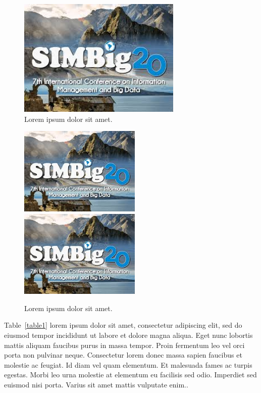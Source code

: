 \documentclass[runningheads]{llncs}
\begin{document}
\begin{figure}[!htbp]
\centerline{\includegraphics[width=78mm]{images/image-example.jpeg}}
\caption{Lorem ipsum dolor sit amet.} \label{figure3}
\end{figure}

\begin{figure}[!htbp]
\centering
{\includegraphics[width=58mm]{images/image-example.jpeg}} \quad
{\includegraphics[width=58mm]{images/image-example.jpeg}}
\caption{Lorem ipsum dolor sit amet.} \label{figure4}
\end{figure}


Table~\ref{table1} lorem ipsum dolor sit amet, consectetur adipiscing elit, sed do eiusmod tempor incididunt ut labore et dolore magna aliqua. Eget nunc lobortis mattis aliquam faucibus purus in massa tempor. Proin fermentum leo vel orci porta non pulvinar neque. Consectetur lorem donec massa sapien faucibus et molestie ac feugiat. Id diam vel quam elementum. Et malesuada fames ac turpis egestas. Morbi leo urna molestie at elementum eu facilisis sed odio. Imperdiet sed euismod nisi porta. Varius sit amet mattis vulputate enim..
\end{document}
